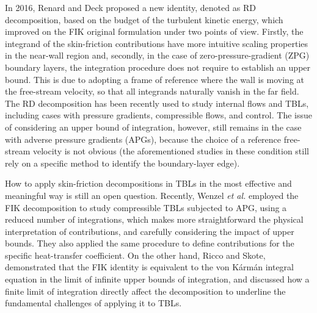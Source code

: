 In 2016, Renard and Deck\cite{rena16} proposed a new identity, denoted as RD decomposition, based on the budget of the turbulent kinetic energy, which improved on the FIK original formulation under two points of view. Firstly, the integrand of the skin-friction contributions have more intuitive scaling properties in the near-wall region and, secondly, in the case of zero-pressure-gradient (ZPG) boundary layers, the integration procedure does not require to establish an upper bound. This is due to adopting a frame of reference where the wall is moving at the free-stream velocity, so that all integrands naturally vanish in the far field. The RD decomposition has been recently used to study internal flows and TBLs, including cases with pressure gradients\cite{Wei2018,Fan2020a,Fan2020}, compressible flows\cite{Li2019}, and control\cite{fan2022}. The issue of considering an upper bound of integration, however, still remains in the case with adverse pressure gradients (APGs), because the choice of a reference free-stream velocity is not obvious (the aforementioned studies in these condition still rely on a specific method to identify the boundary-layer edge\cite{Fan2020,fan2022}). 


How to apply skin-friction decompositions in TBLs in the most effective and meaningful way is still an open question. Recently, Wenzel \textit{et al.}\cite{wenz22} employed the FIK decomposition to study compressible TBLs subjected to APG, using a reduced number of integrations, which makes more straightforward the physical interpretation of contributions, and carefully considering the impact of upper bounds. They also applied the same procedure to define contributions for the specific heat-transfer coefficient. On the other hand, Ricco and Skote\cite{ricc22}, demonstrated that the FIK identity is equivalent to the von K\'arm\'an integral equation in the limit of infinite upper bounds of integration, and discussed how a finite limit of integration directly affect the decomposition to underline the fundamental challenges of applying it to TBLs. 


